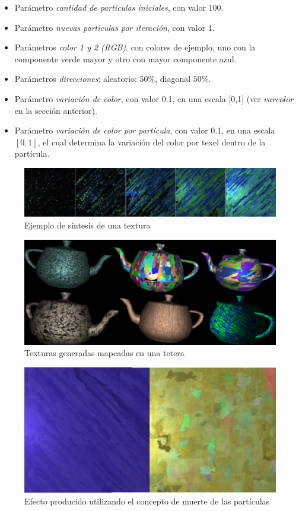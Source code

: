 \documentclass[spanish,a4paper,11pt,oneside,links]{report}
\begin{document}
\begin{itemize}
\item Par\'ametro {\em cantidad de part\'iculas iniciales}, con valor $100$.
\item Par\'ametro {\em nuevas particulas por iteraci\'on}, con valor $1$.
\item Par\'ametros {\em color 1 y 2 (RGB)}. con colores de ejemplo, uno con la componente verde mayor y otro con mayor componente azul.
\item Par\'ametros {\em direcciones}: aleatorio: $50\%$, diagonal $50\%$.
\item Par\'ametro {\em variaci\'on de color}, con valor 0.1, en una escala [0,1] (ver $varcolor$ en la secci\'on anterior).
\item Par\'ametro {\em variaci\'on de color por part\'icula}, con valor 0.1, en una escala $[0,1]$, el cual determina la variaci\'on del color por texel dentro de la part\'icula.
\end{itemize}

\begin{figure}[t!]
\centering
\includegraphics[scale=0.12]{sintesis}
\caption{Ejemplo de s\'intesis de una textura}
\label{sintesis}
\end{figure}

\begin{figure}[t!]
\centering
\includegraphics[scale=0.14]{teteras}
\caption{Texturas generadas mapeadas en una tetera}
\label{teteras}
\end{figure}


\begin{figure}[t!]
\centering
\includegraphics[scale=0.2]{muerte}
\caption{Efecto producido utilizando el concepto de muerte de las part\'iculas}
\label{muerte}
\end{figure}
\end{document}
